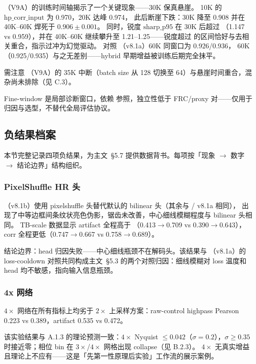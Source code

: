（V9A）的训练时间轴揭示了一个关键现象——30K 保真悬崖。 10K 的 \(\text{hp\_corr\_input}\) 为 0.970，20K 达峰 0.974，
此后断崖下跌：30K 降至 0.908 并在 40K--60K 焊死于 \(0.906 \pm 0.001\)。
同时，锐度 \(\text{sharp\_p95}\) 在 30K 后超过 （1.147 vs 0.959），并在 40K--60K 继续攀升至 1.21--1.25——锐度超过  的区间恰好与去相关重合，指示过冲为幻觉驱动。
对照 （v8.1a）60K 同窗口为 0.926/0.936， 60K（0.925/0.935）与之无差别——hybrid 早期增益被训练后期完全抹平。

需注意 （V9A）的 35K 中断（batch size 从 128 切换至 64）与悬崖时间重合，混杂尚未排除（见 C.3）。

Fine-window 是局部诊断窗口，依赖  参照，独立性低于 FRC/proxy 对——仅用于归因与选型，不替代全局评估协议。

\subsection{负结果档案}

本节完整记录四项负结果，为主文~\S5.7 提供数据背书。每项按「现象 \(\rightarrow\) 数字 \(\rightarrow\) 结论边界」结构组织。

\subsubsection{PixelShuffle HR 头}

（v8.1b）使用 pixelshuffle  头替代默认的 bilinear 头（其余与  / v8.1a 相同），
出现了中等边框间条纹状亮色伪影，锯齿未改善，中心细线模糊程度与 bilinear 头相同。
TB-scale 数据显示 artifact 全程高于 （0.413\(\rightarrow\)0.709 vs 0.390\(\rightarrow\)0.643），corr 全程更低（0.747\(\rightarrow\)0.667 vs 0.758\(\rightarrow\)0.689）。

结论边界：head 归因失败——中心细线瓶颈不在解码头。该结果与 （v8.1a）的 loss-cooldown 对照共同构成主文~\S5.3 的两个对照归因：细线模糊对 loss 温度和 head 均不敏感，指向输入信息瓶颈。

\subsubsection{4x 网络}

 \(4\times\) 网络在所有指标上均劣于  \(2\times\) 上采样方案：raw-control highpass Pearson 0.223 vs 0.389，artifact 0.535 vs 0.472。

该实验结果与 A.1.3 的理论预测一致：\(4\times\) Nyquist  \(\le 0.042\)（\(\sigma = 0.2\)），\(\sigma \ge 0.35\) 时接近零；相位 bin 在 \(3\times\)/\(4\times\) 网格出现 collapse（见 B.2.3）。
\(4\times\) 无真实增益且理论上不应有——这是「先第一性原理后实验」工作流的展示案例。


